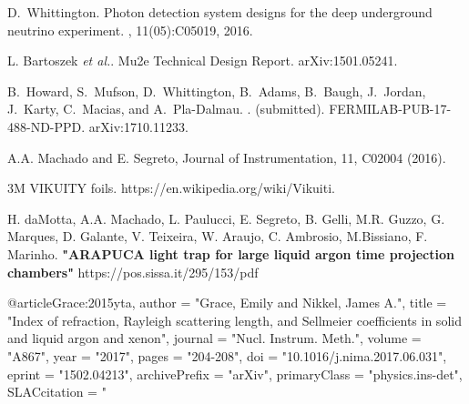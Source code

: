 



\begin{thebibliography}{1}
D.~Whittington.
\newblock Photon detection system designs for the deep underground neutrino
  experiment.
, 11(05):C05019, 2016.

L. Bartoszek \textit{et al.}.
\newblock Mu2e Technical Design Report.
\newblock arXiv:1501.05241.

B.~Howard, S.~Mufson, D.~Whittington, B.~Adams, B.~Baugh, J.~Jordan, J.~Karty,
  C.~Macias, and A.~Pla-Dalmau.
.
 (submitted).
\newblock FERMILAB-PUB-17-488-ND-PPD.
\newblock arXiv:1710.11233.

\end{thebibliography}





\begin{thebibliography}{99}
\footnotesize{

 A.A. Machado and E. Segreto, Journal of Instrumentation, 11, C02004 (2016).

	3M VIKUITY foils. https://en.wikipedia.org/wiki/Vikuiti.
    
 H. daMotta, A.A. Machado, L. Paulucci, E. Segreto, B. Gelli, M.R. Guzzo, G. Marques, D. Galante, V. Teixeira, W. Araujo, C. Ambrosio, M.Bissiano, F. Marinho. {\bf"ARAPUCA light trap for large liquid argon time projection chambers"}
    https://pos.sissa.it/295/153/pdf

}
\end{thebibliography}




@article{Grace:2015yta,
      author         = "Grace, Emily and Nikkel, James A.",
      title          = "{Index of refraction, Rayleigh scattering length, and
                        Sellmeier coefficients in solid and liquid argon and
                        xenon}",
      journal        = "Nucl. Instrum. Meth.",
      volume         = "A867",
      year           = "2017",
      pages          = "204-208",
      doi            = "10.1016/j.nima.2017.06.031",
      eprint         = "1502.04213",
      archivePrefix  = "arXiv",
      primaryClass   = "physics.ins-det",
      SLACcitation   = "%
}
